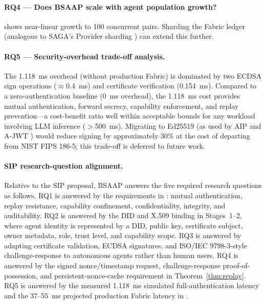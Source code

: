 \documentclass[review,5p,twocolumn,times]{elsarticle}
\begin{document}
\paragraph{RQ4 --- Does BSAAP scale with agent population growth?}
 shows near-linear growth to 100 concurrent pairs.
Sharding the Fabric ledger (analogous to SAGA's Provider sharding
\cite{saga2026}) can extend this further.

\paragraph{RQ5 --- Security-overhead trade-off analysis.}
The 1.118~ms overhead (without production Fabric) is dominated by two ECDSA
sign operations ($\approx$0.4~ms) and certificate verification (0.154~ms).
Compared to a zero-authentication baseline (0~ms overhead), the 1.118~ms
cost provides mutual authentication, forward secrecy, capability enforcement,
and replay prevention---a cost-benefit ratio well within acceptable bounds
for any workload involving LLM inference ($>$500~ms). Migrating
to Ed25519 (as used by AIP \cite{aip2026} and A-JWT \cite{agenticjwt2025})
would reduce signing by approximately 30\% at the cost of departing from
NIST FIPS 186-5; this trade-off is deferred to future work.

\paragraph{SIP research-question alignment.}
Relative to the SIP proposal, BSAAP answers the five required research
questions as follows. RQ1 is answered by the requirements in
: mutual authentication, replay resistance, capability
confinement, confidentiality, integrity, and auditability. RQ2 is answered
by the DID and X.509 binding in Stages~1--2, where agent identity is
represented by a DID, public key, certificate subject, owner metadata, role,
trust level, and capability scope. RQ3 is answered by adapting certificate
validation, ECDSA signatures, and ISO/IEC 9798-3-style challenge-response
to autonomous agents rather than human users. RQ4 is answered by the
signed nonce/timestamp request, challenge-response proof-of-possession, and
persistent-nonce-cache requirement in Theorem~\ref{thm:replay}. RQ5 is
answered by the measured 1.118~ms simulated full-authentication latency and
the 37--55~ms projected production Fabric latency in .

\end{document}
